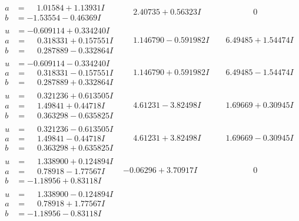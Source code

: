 \documentclass[1p]{elsarticle_modified}
\theoremstyle{definition}
\begin{document}
$$\begin{array}{c|c|c}
\begin{aligned}
a &= \phantom{-}1.01584 + 1.13931 I \\
b &= -1.53554 - 0.46369 I\end{aligned}
 & \phantom{-}2.40735 + 0.56323 I & \phantom{-0.000000 } 0 \\ \hline\begin{aligned}
u &= -0.609114 + 0.334240 I \\
a &= \phantom{-}0.318331 + 0.157551 I \\
b &= \phantom{-}0.287889 - 0.332864 I\end{aligned}
 & \phantom{-}1.146790 - 0.591982 I & \phantom{-}6.49485 + 1.54474 I \\ \hline\begin{aligned}
u &= -0.609114 - 0.334240 I \\
a &= \phantom{-}0.318331 - 0.157551 I \\
b &= \phantom{-}0.287889 + 0.332864 I\end{aligned}
 & \phantom{-}1.146790 + 0.591982 I & \phantom{-}6.49485 - 1.54474 I \\ \hline\begin{aligned}
u &= \phantom{-}0.321236 + 0.613505 I \\
a &= \phantom{-}1.49841 + 0.44718 I \\
b &= \phantom{-}0.363298 - 0.635825 I\end{aligned}
 & \phantom{-}4.61231 - 3.82498 I & \phantom{-}1.69669 + 0.30945 I \\ \hline\begin{aligned}
u &= \phantom{-}0.321236 - 0.613505 I \\
a &= \phantom{-}1.49841 - 0.44718 I \\
b &= \phantom{-}0.363298 + 0.635825 I\end{aligned}
 & \phantom{-}4.61231 + 3.82498 I & \phantom{-}1.69669 - 0.30945 I \\ \hline\begin{aligned}
u &= \phantom{-}1.338900 + 0.124894 I \\
a &= \phantom{-}0.78918 - 1.77567 I \\
b &= -1.18956 + 0.83118 I\end{aligned}
 & -0.06296 + 3.70917 I & \phantom{-0.000000 } 0 \\ \hline\begin{aligned}
u &= \phantom{-}1.338900 - 0.124894 I \\
a &= \phantom{-}0.78918 + 1.77567 I \\
b &= -1.18956 - 0.83118 I\end{aligned}

\end{array}$$
\end{document}
